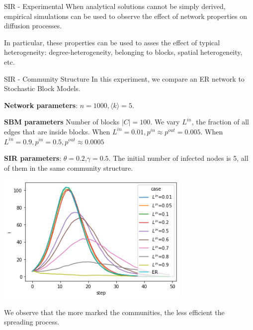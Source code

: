 \documentclass[a4paper,11pt]{book}
\begin{document}
\begin{textbox}{SIR - Experimental}
When analytical solutions cannot be simply derived, empirical simulations can be used to observe the effect of network properties on diffusion processes. 

In particular, these properties can be used to asses the effect of typical heterogeneity: degree-heterogeneity, belonging to blocks, spatial heterogeneity, etc.
\end{textbox}

\begin{textbox}{SIR - Community Structure}
In this experiment, we compare an ER network to Stochastic Block Models. 

\textbf{Network parameters}: $n=1000,\langle k \rangle=5$.

\textbf{SBM parameters} Number of blocks $|C|= 100$.  We vary $L^{in}$, the fraction of all edges that are inside blocks. When $L^{in}=0.01,p^{in} \approx p^{out}=0.005$. When $L^{in}=0.9, p^{in}=0.5,p^{out}\approx0.0005$


\textbf{SIR parameters}: $\theta=0.2$,$\gamma=0.5$.
The initial number of infected nodes is 5, all of them in the same community structure.

\centering
\includegraphics[width=0.7\textwidth]{pics/sir_com.png}

We observe that the more marked the communities, the less efficient the spreading process.

\end{textbox}
\end{document}
